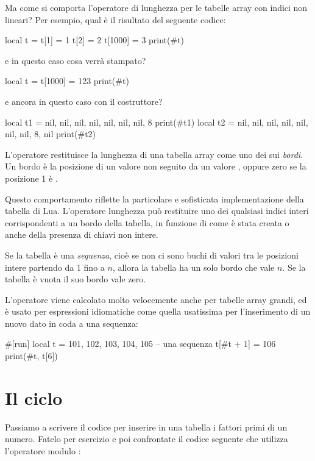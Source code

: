Ma come si comporta l'operatore di lunghezza \key{\#}\luas{\#} per le
tabelle array con indici non lineari? Per esempio, qual è il risultato del
seguente codice:
\begin{lines}
local t = {}
t[1] = 1
t[2] = 2
t[1000] = 3
print(#t)
\end{lines}
e in questo caso cosa verrà stampato?
\begin{lines}
local t = {}
t[1000] = 123
print(#t)
\end{lines}
e ancora in questo caso con il costruttore?
\begin{lines}
local t1 = {nil, nil,  nil, nil, nil, nil, nil, 8}
print(#t1)
local t2 = {nil, nil,  nil, nil, nil, nil, nil, 8, nil}
print(#t2)
\end{lines}

L'operatore \key{\#} restituisce la lunghezza di una tabella array come uno dei
sui \emph{bordi}. Un bordo è la posizione di un valore non  seguito da
un valore , oppure zero se la posizione 1 è .

Questo comportamento riflette la particolare e sofisticata implementazione della
tabella di Lua. L'operatore lunghezza \key{\#} può restituire uno dei
qualsiasi indici interi corrispondenti a un bordo della tabella, in funzione di
come è stata creata o anche della presenza di chiavi non intere.

Se la tabella è una \emph{sequenza}, cioè se non ci sono buchi di valori tra le
posizioni intere partendo da 1 fino a \( n \), allora la tabella ha un solo
bordo che vale \( n \). Se la tabella è vuota il suo bordo vale zero.

L'operatore \key{\#} viene calcolato molto velocemente anche per tabelle array
grandi, ed è usato per espressioni idiomatiche come quella usatissima per
l'inserimento di un nuovo dato in coda a una sequenza:
\begin{lines}
#[run]
local t = {101, 102, 103, 104, 105} -- una sequenza
t[#t + 1] = 106
print(#t, t[6])
\end{lines}


\section{Il ciclo }
\label{secCicloWhile}

Passiamo a scrivere il codice per inserire in una tabella i fattori primi di un
numero. Fatelo per esercizio e poi confrontate il codice seguente che utilizza
l'operatore modulo \key{\%}:

